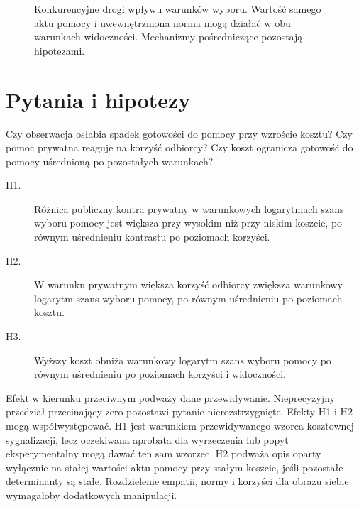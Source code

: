 \documentclass[11pt,a4paper]{article}
\begin{document}
\begin{figure}[htbp]
\centering
{}
\caption{Konkurencyjne drogi wpływu warunków wyboru. Wartość samego aktu pomocy i uwewnętrzniona norma mogą działać w obu warunkach widoczności. Mechanizmy pośredniczące pozostają hipotezami.}
\end{figure}

\section{Pytania i hipotezy}
Czy obserwacja osłabia spadek gotowości do pomocy przy wzroście kosztu? Czy pomoc prywatna reaguje na korzyść odbiorcy? Czy koszt ogranicza gotowość do pomocy uśrednioną po pozostałych warunkach?
\begin{description}
\item[H1.] Różnica publiczny kontra prywatny w warunkowych logarytmach szans wyboru pomocy jest większa przy wysokim niż przy niskim koszcie, po równym uśrednieniu kontrastu po poziomach korzyści.
\item[H2.] W warunku prywatnym większa korzyść odbiorcy zwiększa warunkowy logarytm szans wyboru pomocy, po równym uśrednieniu po poziomach kosztu.
\item[H3.] Wyższy koszt obniża warunkowy logarytm szans wyboru pomocy po równym uśrednieniu po poziomach korzyści i widoczności.
\end{description}
Efekt w kierunku przeciwnym podważy dane przewidywanie. Nieprecyzyjny przedział przecinający zero pozostawi pytanie nierozstrzygnięte. Efekty H1 i H2 mogą współwystępować. H1 jest warunkiem przewidywanego wzorca kosztownej sygnalizacji, lecz oczekiwana aprobata dla wyrzeczenia lub popyt eksperymentalny mogą dawać ten sam wzorzec. H2 podważa opis oparty wyłącznie na stałej wartości aktu pomocy przy stałym koszcie, jeśli pozostałe determinanty są stałe. Rozdzielenie empatii, normy i korzyści dla obrazu siebie wymagałoby dodatkowych manipulacji.
\end{document}
